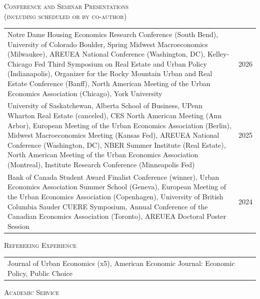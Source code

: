 \documentclass[11pt]{amsart}
\begin{document}
\normalsize

\vspace{0.4cm}
\LARGE
\textsc{Conference and Seminar Presentations \scriptsize \\ (including scheduled or by co-author)}
\vspace{0.2cm}
\normalsize

\begin{tabular}{ p{12.5cm} p{5cm}}
	
Notre Dame Housing Economics Research Conference (South Bend), University of Colorado Boulder, Spring Midwest Macroeconomics (Milwaukee), AREUEA National Conference (Washington, DC), Kelley-Chicago Fed Third Symposium on Real Estate and Urban Policy (Indianapolis), Organizer for the Rocky Mountain Urban and Real Estate Conference (Banff), North American Meeting of the Urban Economics Association (Chicago), York University  & 2026\\

University of Saskatchewan, Alberta School of Business, UPenn Wharton Real Estate (canceled), CES North American Meeting (Ann Arbor), European Meeting of the Urban Economics Association (Berlin), Midwest Macroeconomics Meeting (Kansas Fed), AREUEA National Conference (Washington, DC), NBER Summer Institute (Real Estate), North American Meeting of the Urban Economics Association (Montreal), Institute Research Conference (Minneapolis Fed)   & 2025 \\	
	
Bank of Canada Student Award Finalist Conference (winner), Urban Economics Association Summer School (Geneva), European Meeting of the Urban Economics Association (Copenhagen), University of British Columbia Sauder CUERE Symposium, Annual Conference of the Canadian Economics Association (Toronto),  AREUEA Doctoral Poster Session   & 2024  \\	

\end{tabular}


\vspace{0.4cm}

\LARGE
\textsc{Refereeing Experience}
\vspace{0.2cm}
\normalsize

\begin{tabular}{ p{17.5cm} }
Journal of Urban Economics (x5), American Economic Journal: Economic Policy, Public Choice \\
\end{tabular}
 

\vspace{0.4cm}
\LARGE
\textsc{Academic Service}
\vspace{0.2cm}
\end{document}
